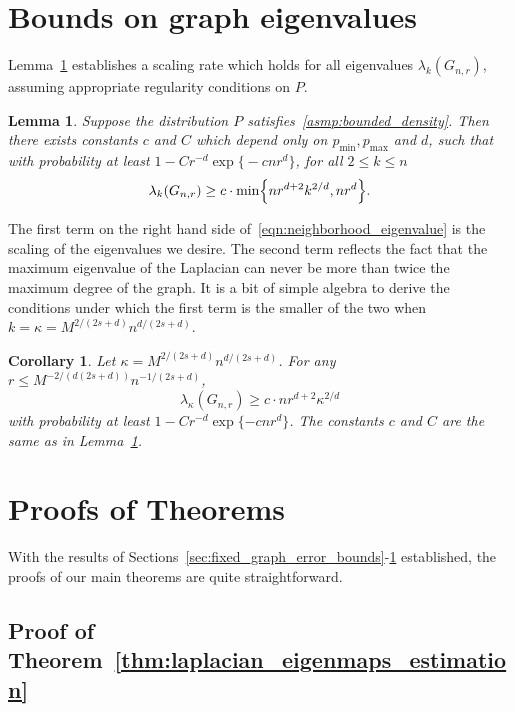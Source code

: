 \documentclass{article}
\newcommand{\1}{\mathbf{1}}
\theoremstyle{alden}
\theoremstyle{aldenthm}
\newtheorem{lemma}{Lemma}
\newtheorem{corollary}{Corollary}
\theoremstyle{definition}
\theoremstyle{remark}
\begin{document}
\section{Bounds on graph eigenvalues}
\label{sec:graph_eigenvalues}
Lemma~\ref{lem:neighborhood_eigenvalue} establishes a scaling rate which holds for all eigenvalues $\lambda_{k}(G_{n,r})$, assuming appropriate regularity conditions on $P$.
\begin{lemma}
	\label{lem:neighborhood_eigenvalue}
	Suppose the distribution $P$ satisfies~\ref{asmp:bounded_density}. Then there exists constants $c$ and $C$ which depend only on $p_{\min}, p_{\max}$ and $d$, such that with probability at least $1 - C r^{-d} \exp\bigl\{- c n r^d\bigr\}$, for all $2 \leq k \leq n$
	\begin{equation}
	\label{eqn:neighborhood_eigenvalue}
	\lambda_k(G_{n,r}) \geq c \cdot \min\Bigl\{nr^{d + 2}k^{2/d}, nr^d\Bigr\}.
	\end{equation}	
\end{lemma}
The first term on the right hand side of~\eqref{eqn:neighborhood_eigenvalue} is the scaling of the eigenvalues we desire. The second term reflects the fact that the maximum eigenvalue of the Laplacian can never be more than twice the maximum degree of the graph. It is a bit of simple algebra to derive the conditions under which the first term is the smaller of the two when $k = \kappa = M^{2/(2s + d)} n^{d/(2s + d)}$.
\begin{corollary}
	\label{cor:neighborhood_eigenvalue}
	Let $\kappa = M^{2/(2s + d)} n^{d/(2s + d)}$. For any $r \leq M^{-2/(d(2s +d))} n^{-1/(2s + d)}$, 
	\begin{equation}
	\label{eqn:neighborhood_eigenvalue_1}
	\lambda_{\kappa}(G_{n,r}) \geq c \cdot nr^{d+2}{\kappa}^{2/d}
	\end{equation}
	with probability at least $1 - C r^{-d} \exp\{- c n r^d\}$. The constants $c$ and $C$ are the same as in Lemma~\ref{lem:neighborhood_eigenvalue}.
\end{corollary}

\section{Proofs of Theorems}
\label{sec:proofs_theorems}
With the results of Sections~\ref{sec:fixed_graph_error_bounds}-\ref{sec:graph_eigenvalues} established, the proofs of our main theorems are quite straightforward.

\subsection{Proof of Theorem~\ref{thm:laplacian_eigenmaps_estimation}}
\label{subsec:laplacian_eigenmaps_estimation_pf}
\end{document}
